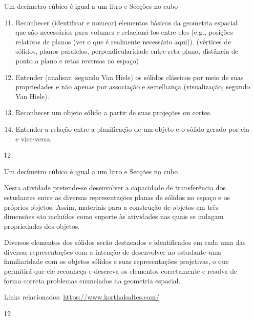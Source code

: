 \clearpage
\def\currentcolor{session2}
\begin{objectives}{Um decímetro cúbico é igual a um litro e Secções no cubo}
{
\begin{enumerate}\setcounter{enumi}{10}
\item Reconhecer (identificar e nomear) elementos básicos da geometria espacial que são necessários para volumes e relacioná-los entre eles (e.g., posições relativas de planos (ver o que é realmente necessário aqui)).  (vértices de sólidos, planos paralelos, perpendicularidade entre reta plano, distância de ponto a plano e retas reversas no espaço)

\item Entender (analisar, segundo Van Hiele) os sólidos clássicos por meio de suas propriedades e não apenas por associação e semelhança (visualização, segundo Van Hiele).

\item Reconhecer um objeto sólido a partir de suas projeções ou cortes.

\item Entender a relação entre a planificação de um objeto e o sólido gerado por ela e vice-versa.
\end{enumerate}
}{1}{2}
\end{objectives}
\begin{sugestions}{Um decímetro cúbico é igual a um litro e Secções no cubo}
{
Nesta atividade pretende-se desenvolver a capacidade de transferência dos estudantes entre as diversas representações planas de sólidos no espaço e os próprios objetos. Assim, materiais para a construção de objetos em três dimensões são incluídos como suporte às atividades nas quais se indagam propriedades dos objetos.

Diversos elementos dos sólidos serão destacados e identificados em cada uma das diversas representações com a intenção de desenvolver no estudante uma familiaridade com os objetos sólidos e suas representações projetivas, o que permitirá que ele reconheça e descreva os elementos corretamente e resolva de forma correta problemas enunciados na geometria espacial.

Links relacionados: \url{https://www.korthalsaltes.com/}
}{1}{2}
\end{sugestions}
